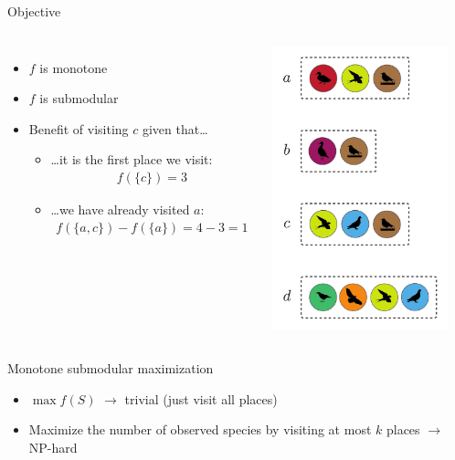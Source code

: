 \documentclass[xetex,10pt,mathserif]{beamer}
\begin{document}
\begin{frame}{Objective}
\begin{columns}[c]
\begin{itemize}
\item $f$ is monotone
\vspace{2em}
\item $f$ is submodular
\vspace{2em}
\item Benefit of visiting $c$ given that\ldots
\begin{itemize}
\vspace{1em}
\item \ldots it is the first place we visit:
\begin{align*}
  f(\{c\}) = 3
\end{align*}
\item \ldots we have already visited $a$:
\begin{align*}
  f(\{a, c\}) - f(\{a\}) = 4 - 3 = 1
\end{align*}
\end{itemize}
\end{itemize}
\centering
\includegraphics[width=2in]{figures/sets.pdf}
\end{columns}
\end{frame}

\begin{frame}{Monotone submodular maximization}
\begin{itemize}
\item $\max f(S)$ $\rightarrow$ trivial (just visit all places)
\vspace{2em}
\item Maximize the number of observed species by visiting at most $k$ places $\rightarrow$ NP-hard
\end{itemize}
\end{frame}
\end{document}
